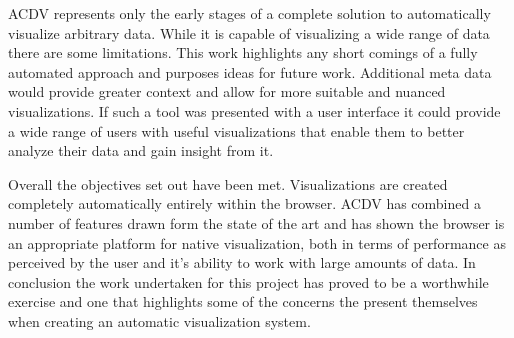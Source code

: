 \documentclass[a4paper, 11pt, titlepage, onehalfspacing]{report}
\begin{document}
AC\lightning{}DV represents only the early stages of a complete solution to automatically visualize arbitrary data. While it is capable of visualizing a wide range of data there are some limitations. This work highlights any short comings of a fully automated approach and purposes ideas for future work. Additional meta data would provide greater context and allow for more suitable and nuanced visualizations. If such a tool was presented with a user interface it could provide a wide range of users with useful visualizations that enable them to better analyze their data and gain insight from it.

Overall the objectives set out have been met. Visualizations are created completely automatically entirely within the browser. AC\lightning{}DV has combined a number of features drawn form the state of the art and has shown the browser is an appropriate platform for native visualization, both in terms of performance as perceived by the user and it's ability to work with large amounts of data. In conclusion the work undertaken for this project has proved to be a worthwhile exercise and one that highlights some of the concerns the present themselves when creating an automatic visualization system.







\end{document}
